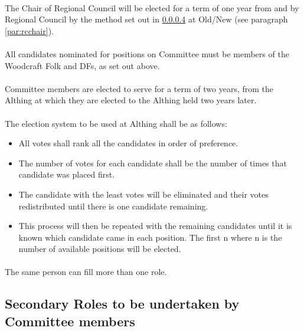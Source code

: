 \documentclass[a4paper, 12pt]{article}
\begin{document}
\paragraph{}
The Chair of Regional Council will be elected for a term of one year from and by Regional Council by the method set out in \ref{sec:electionprocedure} at Old/New (see paragraph \ref{par:rcchair}).

\paragraph{}
All candidates nominated for positions on Committee must be members of the Woodcraft Folk and DFs, as set out above.

\paragraph{}
Committee members are elected to serve for a term of two years, from the Althing at which they are elected to the Althing held two years later.

\paragraph{}
\label{sec:electionprocedure}
The election system to be used at Althing shall be as follows:
\begin{itemize}
\item All votes shall rank all the candidates in order of preference.
\item The number of votes for each candidate shall be the number of times that candidate was placed first.
\item The candidate with the least votes will be eliminated and their votes redistributed until there is one candidate remaining.
\item This process will then be repeated with the remaining candidates until it is known which candidate came in each position. The first n where n is the number of available positions will be elected.
\end{itemize}

\paragraph{}
\label{sec:moreroles}
The same person can fill more than one role.

\subsection{Secondary Roles to be undertaken by Committee members}
\label{sec:secondaryroles}
\end{document}
